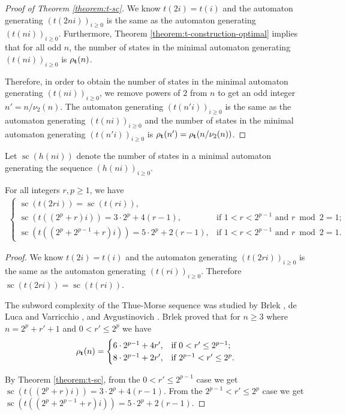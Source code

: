 \documentclass[12pt,reqno]{article}
\DeclareMathOperator{\statecomplexity}{sc}
\begin{document}
\begin{proof}[Proof of Theorem \ref{theorem:t-sc}]
    We know $t(2i) = t(i)$ and the automaton generating $(t(2ni))_{i \geq 0}$ is the same as the automaton generating $(t(ni))_{i \geq 0}$.
    Furthermore, Theorem \ref{theorem:t-construction-optimal} implies that for all odd $n$, the number of states in the minimal automaton generating $(t(ni))_{i \geq 0}$ is $\rho_{\bf t}(n)$.
    
    Therefore, in order to obtain the number of states in the minimal automaton generating $(t(ni))_{i \geq 0}$, we remove powers of $2$ from $n$ to get an odd integer $n' = n / \nu_2(n)$. The automaton generating $(t(n'i))_{i \geq 0}$ is the same as the automaton generating $(t(ni))_{i \geq 0}$ and the number of states in the minimal automaton generating $(t(n'i))_{i \geq 0}$ is $\rho_{\bf t}(n')=\rho_{\bf t}(n/\nu_2(n))$.
\end{proof}

Let $\statecomplexity(h(ni))$ denote the number of states in a minimal automaton generating the sequence $(h(ni))_{i \geq 0}$.

\begin{corollary} \label{corollary:t(ni)-sc}
    For all integers $r, p \geq 1$, we have
    \begin{align*}
        \begin{cases}
            \statecomplexity(t(2ri)) = \statecomplexity(t(ri)), \\
            \statecomplexity(t((2^p + r)i)) = 3 \cdot 2^p + 4(r-1), & \text{if $1 < r < 2^{p-1}$ and $r \bmod 2 = 1$};
            \\
            \statecomplexity(t((2^p + 2^{p-1} + r)i)) = 5\cdot 2^p + 2(r-1), & \text{if  $1 < r < 2^{p-1}$ and $r \bmod 2 = 1$}.
        \end{cases}
    \end{align*}
\end{corollary}

\begin{proof}
    We know $t(2i) = t(i)$ and the automaton generating $(t(2ri))_{i \geq 0}$ is the same as the automaton generating $(t(ri))_{i \geq 0}$. Therefore $\statecomplexity(t(2ri)) = \statecomplexity(t(ri))$.

    The subword complexity of the Thue-Morse sequence was studied by Brlek \cite{brlek_enumeration_1989}, de Luca and Varricchio \cite{de_luca_combinatorial_1989}, and Avgustinovich \cite{avgustinovich_number_1994}. Brlek \cite{brlek_enumeration_1989} proved that for $n \geq 3$ where $n=2^p + r'+1$ and $0 < r'\leq 2^p$ we have
    \[
    \rho_{\bf t}(n) = 
    \begin{cases}
        6\cdot 2^{p-1} + 4r', & \text{if $0 < r' \leq 2^{p-1}$}; \\
        8\cdot 2^{p-1} + 2r', & \text{if $2^{p-1} < r' \leq 2^p$}.
    \end{cases}
    \]

    By Theorem \ref{theorem:t-sc}, from the $ 0 < r'\leq 2^{p-1}$ case we get $\statecomplexity(t((2^p + r)i)) = 3 \cdot 2^p + 4(r-1)$. From the $2^{p-1}< r' \leq 2^p$ case we get $\statecomplexity(t((2^p + 2^{p-1} + r)i)) = 5\cdot 2^p + 2(r-1)$.
\end{proof}
\end{document}
